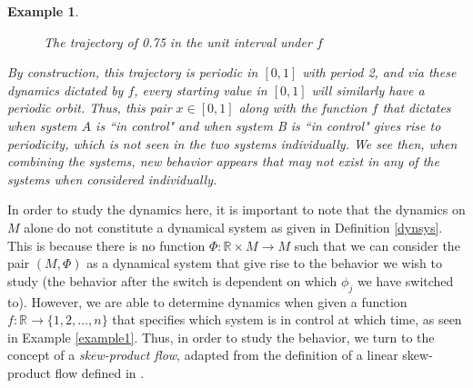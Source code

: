 \documentclass[11pt]{article}
\newtheorem{ex}[thm]{Example}
\begin{document}
\begin{ex}
\begin{figure}[!ht]
\begin{center}
\caption{The trajectory of 0.75 in the unit interval under $f$}
\end{center}
\end{figure}

By construction, this trajectory is periodic in $[0,1]$ with period 2, and via these dynamics dictated by $f$, every starting value in $[0,1]$ will similarly have a periodic orbit. Thus, this pair $x\in[0,1]$ along with the function $f$ that dictates when system $A$ is ``in control" and when system B is ``in control" gives rise to periodicity, which is not seen in the two systems individually.   We see then, when combining the systems, new behavior appears that may not exist in any of the systems when considered individually.  \end{ex}

\indent In order to study the dynamics here, it is important to note that the dynamics on $M$ alone do not constitute a dynamical system as given in Definition \ref{dynsys}.  This is because there is no function $\Phi:\mathbb{R}\times M\rightarrow M$ such that we can consider the pair $(M,\Phi)$ as a dynamical system that give rise to the behavior we wish to study (the behavior after the switch is dependent on which $\phi_j$ we have switched to).  However, we are able to determine dynamics when given a function $f:\mathbb{R}\rightarrow\{1,2,\ldots,n\}$ that specifies which system is in control at which time, as seen in Example \ref{example1}. Thus, in order to study the behavior, we turn to the concept of a \emph{skew-product flow}, adapted from the definition of a linear skew-product flow defined in \cite{skewproduct}.
\end{document}
